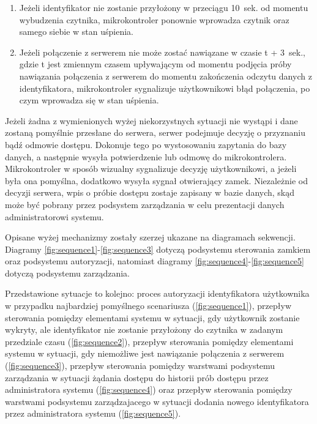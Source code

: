             \begin{enumerate}
                \item
                    Jeżeli identyfikator nie zostanie przyłożony w przeciągu 10~sek. od momentu wybudzenia czytnika, mikrokontroler ponownie wprowadza czytnik oraz samego siebie w stan uśpienia.
                \item
                    Jeżeli połączenie z serwerem nie może zostać nawiązane w czasie t + 3~sek., gdzie t jest zmiennym czasem upływającym od momentu podjęcia próby nawiązania połączenia z serwerem do momentu zakończenia odczytu danych z identyfikatora, mikrokontroler sygnalizuje użytkownikowi błąd połączenia, po czym wprowadza się w stan uśpienia.
            \end{enumerate}

            Jeżeli żadna z wymienionych wyżej niekorzystnych sytuacji nie wystąpi i dane zostaną pomyślnie przesłane do serwera, serwer podejmuje decyzję o przyznaniu bądź odmowie dostępu. Dokonuje tego po wystosowaniu zapytania do bazy danych, a następnie wysyła potwierdzenie lub odmowę do mikrokontrolera. Mikrokontroler w sposób wizualny sygnalizuje decyzję użytkownikowi, a jeżeli była ona pomyślna, dodatkowo wysyła sygnał otwierający zamek. Niezależnie od decyzji serwera, wpis o próbie dostępu zostaje zapisany w bazie danych, skąd może być pobrany przez podsystem zarządzania w celu prezentacji danych administratorowi systemu.

            Opisane wyżej mechanizmy zostały szerzej ukazane na diagramach sekwencji. Diagramy \ref{fig:sequence1}-\ref{fig:sequence3} dotyczą podsystemu sterowania zamkiem oraz podsystemu autoryzacji, natomiast diagramy \ref{fig:sequence4}-\ref{fig:sequence5} dotyczą podsystemu zarządzania.

            Przedstawione sytuacje to kolejno: proces autoryzacji identyfikatora użytkownika w przypadku najbardziej pomyślnego scenariusza (\ref{fig:sequence1}), przepływ sterowania pomiędzy elementami systemu w sytuacji, gdy użytkownik zostanie wykryty, ale identyfikator nie zostanie przyłożony do czytnika w zadanym przedziale czasu (\ref{fig:sequence2}), przepływ sterowania pomiędzy elementami systemu w sytuacji, gdy niemożliwe jest nawiązanie połączenia z serwerem (\ref{fig:sequence3}), przepływ sterowania pomiędzy warstwami podsystemu zarządzania w sytuacji żądania dostępu do historii prób dostępu przez administratora systemu (\ref{fig:sequence4}) oraz przepływ sterowania pomiędzy warstwami podsystemu zarządzajacego w sytuacji dodania nowego identyfikatora przez administratora systemu (\ref{fig:sequence5}).

